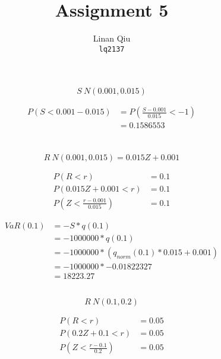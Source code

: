 \documentclass[11pt]{scrartcl}
\title{Assignment 5}
\author{Linan Qiu\\\texttt{lq2137}}
\begin{document}
\maketitle

\section{}

\[S~N(0.001, 0.015)\]

\begin{align*}
P(S < 0.001 - 0.015) &= P\left(\frac{S - 0.001}{0.015} < -1\right) \\
&= 0.1586553
\end{align*}

\section{}

\subsection{}

\[R~N(0.001, 0.015) = 0.015Z + 0.001\]

\begin{align*}
P(R < r) &= 0.1 \\
P(0.015Z + 0.001 < r) &= 0.1 \\
P(Z < \frac{r - 0.001}{0.015}) &= 0.1
\end{align*}

\begin{align*}
VaR(0.1) &= -S * q(0.1) \\
&= -1000000 * q(0.1) \\
&= -1000000 * (q_{norm}(0.1) * 0.015 + 0.001) \\
&= -1000000 * -0.01822327 \\
&= 18223.27
\end{align*}

\subsection{}

\[R~N(0.1, 0.2)\]

\begin{align*}
P(R < r) &= 0.05 \\
P(0.2Z + 0.1 < r) &= 0.05 \\
P(Z < \frac{r - 0.1}{0.2}) &= 0.05
\end{align*}
\end{document}
